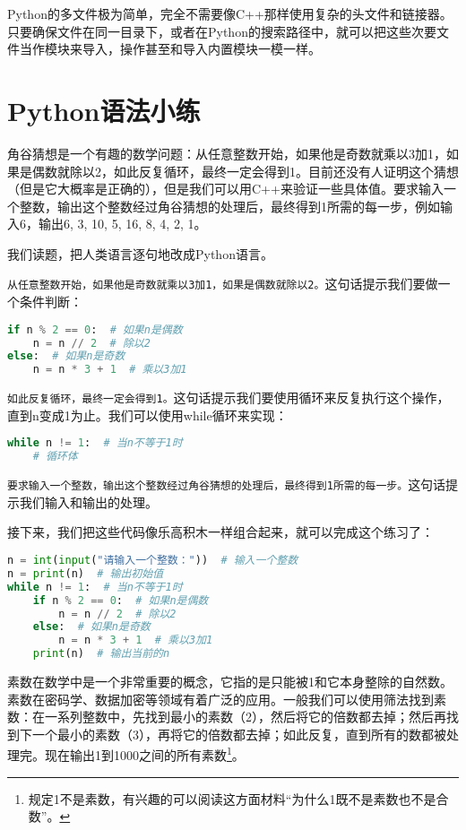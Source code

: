 \documentclass[../main.tex]{subfiles}
\begin{document}
Python的多文件极为简单，完全不需要像C++那样使用复杂的头文件和链接器。只要确保文件在同一目录下，或者在Python的搜索路径中，就可以把这些次要文件当作模块来导入，操作甚至和导入内置模块一模一样。

\section{Python语法小练}

\begin{example}
  角谷猜想是一个有趣的数学问题：从任意整数开始，如果他是奇数就乘以3加1，如果是偶数就除以2，如此反复循环，最终一定会得到1。目前还没有人证明这个猜想（但是它大概率是正确的），但是我们可以用C++来验证一些具体值。要求输入一个整数，输出这个整数经过角谷猜想的处理后，最终得到1所需的每一步，例如输入6，输出6, 3, 10, 5, 16, 8, 4, 2, 1。
\end{example}

\begin{answer}
  我们读题，把人类语言逐句地改成Python语言。

  \texttt{从任意整数开始，如果他是奇数就乘以3加1，如果是偶数就除以2。}这句话提示我们要做一个条件判断：
\begin{lstlisting}[language=python]
if n % 2 == 0:  # 如果n是偶数
    n = n // 2  # 除以2
else:  # 如果n是奇数
    n = n * 3 + 1  # 乘以3加1
\end{lstlisting}
  \texttt{如此反复循环，最终一定会得到1。}这句话提示我们要使用循环来反复执行这个操作，直到n变成1为止。我们可以使用while循环来实现：
\begin{lstlisting}[language=python]
while n != 1:  # 当n不等于1时
    # 循环体
\end{lstlisting}

  \texttt{要求输入一个整数，输出这个整数经过角谷猜想的处理后，最终得到1所需的每一步。}这句话提示我们输入和输出的处理。

  接下来，我们把这些代码像乐高积木一样组合起来，就可以完成这个练习了：
\begin{lstlisting}[language=python]
n = int(input("请输入一个整数："))  # 输入一个整数
n = print(n)  # 输出初始值
while n != 1:  # 当n不等于1时
    if n % 2 == 0:  # 如果n是偶数
        n = n // 2  # 除以2
    else:  # 如果n是奇数
        n = n * 3 + 1  # 乘以3加1
    print(n)  # 输出当前的n
\end{lstlisting}
\end{answer}

\begin{example}
  素数在数学中是一个非常重要的概念，它指的是只能被1和它本身整除的自然数。素数在密码学、数据加密等领域有着广泛的应用。一般我们可以使用筛法找到素数：在一系列整数中，先找到最小的素数（2），然后将它的倍数都去掉；然后再找到下一个最小的素数（3），再将它的倍数都去掉；如此反复，直到所有的数都被处理完。现在输出1到1000之间的所有素数\footnote{规定1不是素数，有兴趣的可以阅读这方面材料“为什么1既不是素数也不是合数”。}。
\end{example}
\end{document}
